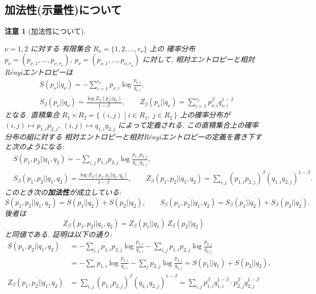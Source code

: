 \documentclass[12pt,twoside]{jarticle}
\theoremstyle{jplain}
\theoremstyle{jplain}
\theoremstyle{jplain}
\newtheorem{remark}[theorem]{注意}
\numberwithin{theorem}{section}
\numberwithin{equation}{section}
\numberwithin{figure}{section}
\numberwithin{table}{section}
\begin{document}

\subsection{加法性(示量性)について}

\begin{remark}[加法性について]
\label{remark:additivity}

$\nu=1,2$ に対する
有限集合 $R_\nu=\{1,2,\ldots,r_\nu\}$ 上の
確率分布 $p_\nu=(p_{\nu,1},\ldots,p_{\nu,r_\nu})$,
$p_\nu=(p_{\nu,1},\ldots,p_{\nu,r_\nu})$ に対して,
相対エントロピーと相対R\'enyiエントロピーは
\begin{align*}
&
S(p_\nu||q_\nu) = -\sum_{i=1}^{r_\nu} p_{\nu,i}\log\frac{p_{\nu,i}}{q_{\nu,i}},
\\ &
S_\beta(p_\nu||q_\nu) = \frac{\log Z_\beta(p_\nu||q_\nu)}{1-\beta},
\qquad
Z_\beta(p_\nu||q_\nu) = \sum_{i=1}^{r_\nu} p_{\nu,i}^\beta q_{\nu,i}^{1-\beta}
\end{align*}
となる.
直積集合 $R_1\times R_2=\{\,(i,j)\mid i\in R_1,\ j\in R_2\,\}$ 上の確率分布が
$(i,j)\mapsto p_{1,i}p_{2,j}$,
$(i,j)\mapsto q_{1,i}q_{2,j}$
によって定義される. この直積集合上の確率分布の組に対する
相対エントロピーと相対R\'enyiエントロピーの定義を書き下すと次のようになる:
\begin{align*}
&
S(p_1,p_2||q_1,q_2)
= -\sum_{i,j} p_{1,i}p_{2,j}\log\frac{p_{1,i}p_{2,j}}{q_{1,i}q_{2,j}},
\\ &
S_\beta(p_1,p_2||q_1,q_2) = \frac{\log Z_\beta(p_1,p_2||q_1,q_2)}{1-\beta},
\qquad
Z_\beta(p_1,p_2||q_1,q_2) = \sum_{i,j} (p_{1,i}p_{2,j})^\beta (q_{1,i}q_{2,j})^{1-\beta}.
\end{align*}
このとき次の{\bfseries 加法性}が成立している:
\[
S(p_1,p_2||q_1,q_2) = S(p_1||q_2) + S(p_2||q_2), \qquad
S_\beta(p_1,p_2||q_1,q_2) = S_\beta(p_1||q_2) + S_\beta(p_2||q_2).
\]
後者は
\[
Z_\beta(p_1,p_2||q_1,q_2)
= Z_\beta(p_1||q_1)\, Z_\beta(p_2||q_2)
\]
と同値である. 証明は以下の通り:
\begin{align*}
S(p_1,p_2||q_1,q_2)
&
=
-\sum_{i,j}p_{1,i}p_{2,j}\log\frac{p_{1,i}}{q_{1,i}}
-\sum_{i,j}p_{1,i}p_{2,j}\log\frac{p_{2,j}}{q_{2,j}}
\\ &
=
-\sum_{i}p_{1,i}\log\frac{p_{1,i}}{q_{1,i}}
-\sum_{j}p_{2,j}\log\frac{p_{2,j}}{q_{2,j}}
= S(p_1||q_1) + S(p_2||q_2),
\\
Z_\beta(p_1,p_2||q_1,q_2)
&
= \sum_{i,j} (p_{1,i}p_{2,j})^\beta (q_{1,i}q_{2,j})^{1-\beta}
= \sum_{i,j} p_{1,i}^\beta q_{1,i}^{1-\beta}\cdot p_{2,j}^\beta q_{2,j}^{1-\beta}

\end{align*}
\end{remark}
\end{document}
